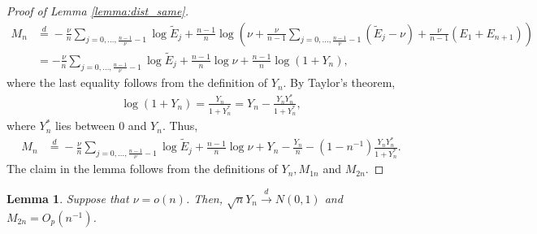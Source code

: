 \documentclass[12pt,letterpaper, twoside, openany]{article}
\theoremstyle{plain}
\newtheorem{lemma}[theorem]{Lemma}
\begin{document}
\begin{proof}[Proof of Lemma \ref{lemma:dist_same}]
	\begin{align*}
		M_n &\stackrel{d}{=} - \frac{\nu}{n} 	\sum_{j=0,\ldots,\frac{n-1}{\nu}-1}  \log \tilde{E}_j + 
		\frac{n-1}{n}	\log \left(\nu + \frac{\nu}{n-1} \sum_{j=0,\ldots,\frac{n-1}{\nu}-1} (\tilde{E}_j - \nu) + \frac{\nu}{n-1} (E_1 + E_{n+1})\right)\\
		&= - \frac{\nu}{n} 	\sum_{j=0,\ldots, \frac{n-1}{\nu}-1}  \log \tilde{E}_j + \frac{n-1}{n} \log \nu +  \frac{n-1}{n}\log 
		\left(1 + Y_n\right),
	\end{align*}
 where the last equality follows from the definition of $Y_n$.	By Taylor's theorem,
	\begin{align*}
		\log 
		\left(1 + Y_n \right)
		= \frac{Y_n}{1+Y^*_n} 
		= Y_n - \frac{Y_n Y^*_n}{1+Y^*_n},
	\end{align*}
	where $Y_n^*$ lies between $0$ and $Y_n$. Thus,
	\begin{align*}
		M_n &\stackrel{d}{=} 
		-\frac{\nu}{n} \sum_{j=0,\ldots, \frac{n-1}{\nu}-1}  \log \tilde{E}_j + \frac{n-1}{n}\log \nu + Y_n - \frac{Y_n}{n}  -  (1-n^{-1})\frac{Y_n Y^*_n}{1+Y^*_n}.
	\end{align*}
The claim in the lemma follows from the definitions of $Y_n, M_{1n}$ and $M_{2n}$.
	
\end{proof}


\begin{lemma}\label{lemma:M2n_order}
Suppose that $\nu = o(n)$. Then, $\sqrt{n}Y_n \stackrel{d}{\rightarrow} N(0, 1)$ and $M_{2n} = O_p(n^{-1})$.
\end{lemma}
\end{document}
